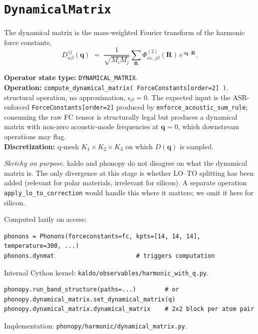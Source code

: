 \documentclass[11pt,a4paper]{article}
\begin{document}
\section{\texttt{DynamicalMatrix}}

\begin{abstractbox}
The dynamical matrix is the mass-weighted Fourier transform of the harmonic force constants,
\begin{equation}
  D_{\alpha\beta}^{\,ij}(\mathbf{q})
  \;=\; \frac{1}{\sqrt{M_i M_j}} \sum_{\mathbf{R}} \Phi^{(2)}_{i\alpha,\,j\beta}(\mathbf{R})\,
        e^{\,i\mathbf{q}\cdot\mathbf{R}}.
\end{equation}

\medskip
\textbf{Operator state type:} \texttt{DYNAMICAL\_MATRIX}.\\
\textbf{Operation:} \texttt{compute\_dynamical\_matrix(\,ForceConstants[order=2]\,)}, structural
operation, no approximation, $\epsilon_{\mathcal{O}} = 0$. The expected input is the ASR-enforced
\texttt{ForceConstants[order=2]} produced by \texttt{enforce\_acoustic\_sum\_rule}; consuming the
raw FC tensor is structurally legal but produces a dynamical matrix with non-zero acoustic-mode
frequencies at $\mathbf{q}=0$, which downstream operations may flag.\\
\textbf{Discretization:} q-mesh $K_1{\times}K_2{\times}K_3$ on which $D(\mathbf{q})$ is sampled.

\medskip
\textit{Sketchy on purpose.} kaldo and phonopy do not disagree on what the dynamical matrix is.
The only divergence at this stage is whether LO--TO splitting has been added (relevant for
polar materials, irrelevant for silicon). A separate operation
\texttt{apply\_lo\_to\_correction} would handle this where it matters; we omit it here for
silicon.
\end{abstractbox}

\begin{kaldobox}
Computed lazily on access:
\begin{verbatim}
phonons = Phonons(forceconstants=fc, kpts=[14, 14, 14], temperature=300, ...)
phonons.dynmat                       # triggers computation
\end{verbatim}
Internal Cython kernel: \texttt{kaldo/observables/harmonic\_with\_q.py}.
\end{kaldobox}

\begin{phonobox}
\begin{verbatim}
phonopy.run_band_structure(paths=...)        # or
phonopy.dynamical_matrix.set_dynamical_matrix(q)
phonopy.dynamical_matrix.dynamical_matrix    # 2x2 block per atom pair
\end{verbatim}
Implementation: \texttt{phonopy/harmonic/dynamical\_matrix.py}.
\end{phonobox}
\end{document}
